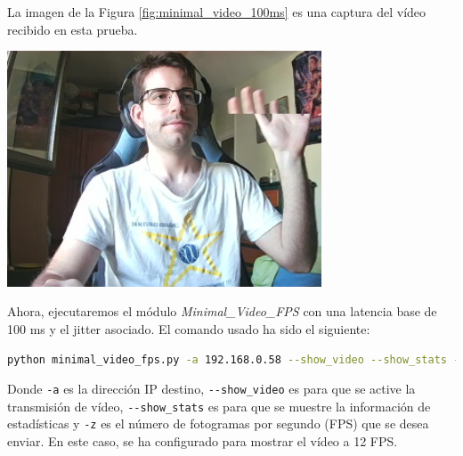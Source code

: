 \newpage
La imagen de la Figura \ref{fig:minimal_video_100ms} es una captura del vídeo recibido en esta prueba.
\begin{center}
  \includegraphics[width = 0.7\textwidth]{images/VideoRecibido5.1.png}
  \label{fig:minimal_video_100ms}
\end{center}

\newpage

Ahora, ejecutaremos el módulo \textit{Minimal\_Video\_FPS} con una latencia base de 100 ms y el jitter asociado. El comando usado ha sido el siguiente:

\begin{lstlisting}[language=bash, basicstyle=\ttfamily\scriptsize]
    python minimal_video_fps.py -a 192.168.0.58 --show_video --show_stats -z 12
\end{lstlisting}
Donde \verb|-a| es la dirección IP destino, \verb|--show_video| es para que se active la transmisión de vídeo, \verb|--show_stats| es para que se muestre la información de estadísticas y \verb|-z| es el número de fotogramas por segundo (FPS) que se desea enviar. En este caso, se ha configurado para mostrar el vídeo a 12 FPS.
\vspace{\baselineskip}

